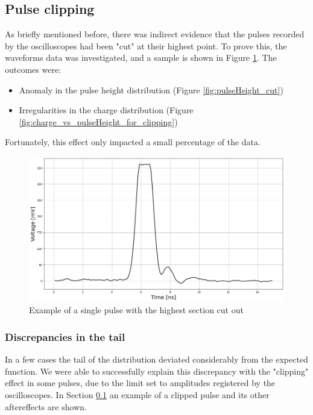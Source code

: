 
\FloatBarrier

\subsection{Pulse clipping}\label{sec:pulse_clipping}

As briefly mentioned before, there was indirect evidence that the pulses recorded by the oscilloscopes had been "cut" at their highest point. To prove this, the waveforms data was investigated, and a sample is shown in Figure \ref{fig:clipped_pulse}. The outcomes were:

\begin{itemize}
    \item Anomaly in the pulse height distribution (Figure \ref{fig:pulseHeight_cut})
    \item Irregularities in the charge distribution (Figure \ref{fig:charge_vs_pulseHeight_for_clipping})
\end{itemize}
Fortunately, this effect only impacted a small percentage of the data.

\begin{figure}[h!tbp]
    \centering
    \includegraphics[width=.9\linewidth]{Images/detailed_analysis/Waveform of clipped pulse (ns).png}
    \captionsetup{width=\captionwidth}
    \caption{Example of a single pulse with the highest section cut out}
    \label{fig:clipped_pulse}
\end{figure}
 

\subsubsection{Discrepancies in the tail}\label{subsec:tail_discrepancies}
In a few cases the tail of the distribution deviated considerably from the expected function. We were able to successfully explain this discrepancy with the "clipping" effect in some pulses, due to the limit set to amplitudes registered by the oscilloscopes.
In Section \ref{sec:pulse_clipping} an example of a clipped pulse and its other aftereffects are shown.

